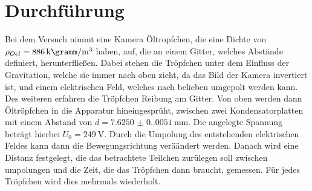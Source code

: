 \section{Durchführung}
Bei dem Versuch nimmt eine Kamera Öltropfchen, die eine Dichte von $\rho_{Oel}=\qty{886}{\kilo\gramm\per\cubic\meter}$ 
haben, auf, die an einem Gitter, welches Abstände definiert, herunterfließen.
Dabei stehen die Tröpfchen unter dem Einfluss der Gravitation, welche sie immer nach oben zieht,
da das Bild der Kamera invertiert ist, und einem elektrischen Feld, welches nach belieben umgepolt werden kann. 
Des weiteren erfahren die Tröpfchen Reibung am Gitter. Von oben werden dann Öltröpfchen in die Apparatur 
hineingesprüht, zwischen zwei Kondensatorplatten mit einem Abstand von $d=\qty{7.6250(0.0051)}{\milli\meter}$. 
Die angelegte Spannung beträgt hierbei $U_0=\qty{249}{\volt}$. Durch die Umpolung des entstehenden elektrischen
Feldes kann dann die Bewegungsrichtung veräändert werden. Danach wird eine Distanz festgelegt, die das betrachtete
Teilchen zurülegen soll zwischen umpolungen und die Zeit, die das Tröpfchen dann braucht, gemessen. Für jedes Tröpfchen
wird dies mehrmals wiederholt.
\label{sec:Durchführung}
